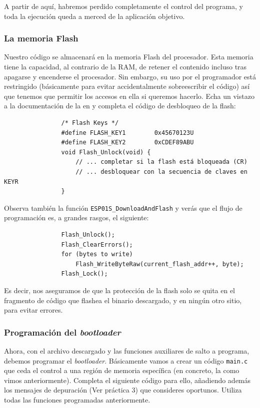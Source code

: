 \documentclass[../main.tex]{subfiles}
\begin{document}
            A partir de aquí, habremos perdido completamente el control del programa, y toda la ejecución queda a merced de la aplicación objetivo.

        \subsubsection{La memoria Flash}

            Nuestro código se almacenará en la memoria Flash del procesador. Esta memoria tiene la capacidad, al contrario de la RAM, de retener el contenido incluso tras apagarse y encenderse el procesador. Sin embargo, su uso por el programador está restringido (básicamente para evitar accidentalmente sobreescribir el código) así que tenemos que permitir los accesos en ella si queremos hacerlo. Echa un vistazo a la documentación de la  en \REFMAN[3.7.2] y completa el código de desbloqueo de la flash:

            \begin{lstlisting}
                /* Flash Keys */
                #define FLASH_KEY1        0x45670123U
                #define FLASH_KEY2        0xCDEF89ABU
                void Flash_Unlock(void) {
                    // ... completar si la flash está bloqueada (CR)
                    // ... desbloquear con la secuencia de claves en KEYR
                }
            \end{lstlisting}

            Observa también la función \texttt{ESP01S\_DownloadAndFlash} y verás que el flujo de programación es, a grandes rasgos, el siguiente:

            \begin{lstlisting}
                Flash_Unlock();
                Flash_ClearErrors();
                for (bytes to write)
                    Flash_WriteByteRaw(current_flash_addr++, byte);
                Flash_Lock();
            \end{lstlisting}

            Es decir, nos aseguramos de que la protección de la flash solo se quita en el fragmento de código que flashea el binario descargado, y en ningún otro sitio, para evitar errores.

        \subsubsection{Programación del \emph{bootloader}}

            Ahora, con el archivo descargado y las funciones auxiliares de salto a programa, debemos programar el \emph{bootloader}. Básicamente vamos a crear un código \texttt{main.c} que ceda el control a una región de memoria específica (en concreto, la  como vimos anteriormente). Completa el siguiente código para ello, añadiendo además los mensajes de depuración (Ver práctica 3) que consideres oportunos. Utiliza todas las funciones programadas anteriormente.
\end{document}
